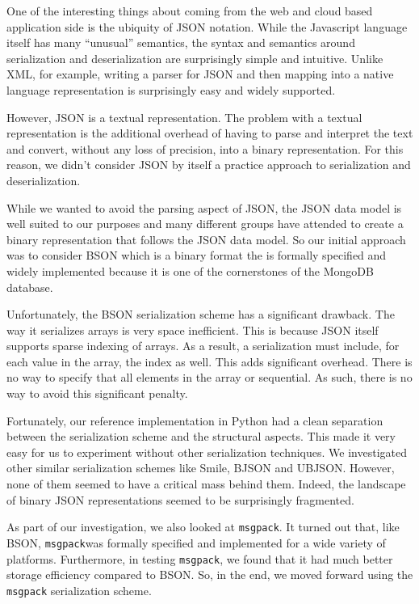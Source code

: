 \documentclass[11pt,a4paper,twocolumn]{article}
\newcommand{\msgpack}{\texttt{msgpack}}
\begin{document}
One of the interesting things about coming from the web and cloud
based application side is the ubiquity of JSON notation.  While the
Javascript language itself has many ``unusual'' semantics, the syntax
and semantics around serialization and deserialization are
surprisingly simple and intuitive.  Unlike XML, for example, writing a
parser for JSON and then mapping into a native language representation
is surprisingly easy and widely supported.

However, JSON is a textual representation.  The problem with a textual
representation is the additional overhead of having to parse and
interpret the text and convert, without any loss of precision, into a
binary representation.  For this reason, we didn't consider JSON by
itself a practice approach to serialization and deserialization.

While we wanted to avoid the parsing aspect of JSON, the JSON data
model \cite{JSON} is well suited to our purposes and many different
groups have attended to create a binary representation that follows
the JSON data model.  So our initial approach was to consider BSON
\cite{BSON} which is a binary format the is formally specified and
widely implemented because it is one of the cornerstones of the
MongoDB database\cite{MongoDB}.

Unfortunately, the BSON serialization scheme has a significant
drawback.  The way it serializes arrays is very space inefficient.
This is because JSON itself supports sparse indexing of arrays.  As a
result, a serialization must include, for each value in the array, the
index as well.  This adds significant overhead.  There is no way to
specify that all elements in the array or sequential.  As such, there
is no way to avoid this significant penalty.

Fortunately, our reference implementation in Python\cite{pyRecon} had
a clean separation between the serialization scheme and the structural
aspects.  This made it very easy for us to experiment without other
serialization techniques.  We investigated other similar serialization
schemes like Smile\cite{Smile}, BJSON\cite{BJSON} and
UBJSON.  However, none of them seemed to have a critical
mass behind them.  Indeed, the landscape of binary JSON
representations seemed to be surprisingly fragmented.

As part of our investigation, we also looked at \msgpack.  It turned
out that, like BSON, \msgpack was formally specified and implemented
for a wide variety of platforms\cite{MsgPack}.  Furthermore, in
testing \msgpack, we found that it had much better storage efficiency
compared to BSON.  So, in the end, we moved forward using the \msgpack
serialization scheme.
\end{document}
